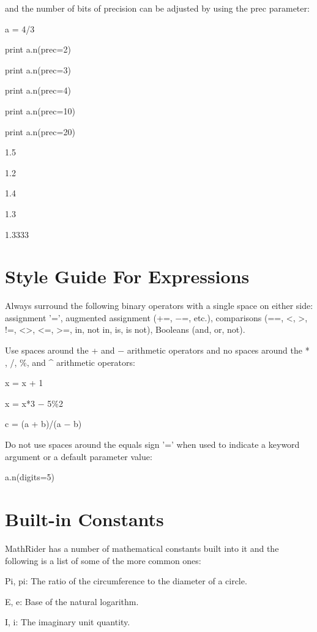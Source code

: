 \documentclass[12pt,oneside]{book}
\begin{document}
and the number of bits of precision can be adjusted by using the prec parameter:


a = 4/3

print a.n(prec=2)

print a.n(prec=3)

print a.n(prec=4)

print a.n(prec=10)

print a.n(prec=20)

{\textbar}

1.5

1.2

1.4

1.3

1.3333

\section[Style Guide For Expressions]{Style Guide For Expressions}

Always surround the following binary operators with a single space on either side: assignment '=', augmented assignment (+=, $-$=, etc.), comparisons (==, {\textless}, {\textgreater}, !=, {\textless}{\textgreater}, {\textless}=, {\textgreater}=, in, not in, is, is not), Booleans (and, or, not). 

Use spaces around the + and $-$ arithmetic operators and no spaces around the * , /, \%, and \^{} arithmetic operators:

x = x + 1

x = x*3 $-$ 5\%2

c = (a + b)/(a $-$ b)


Do not use spaces around the equals sign '=' when used to indicate a keyword argument or a default parameter value:

a.n(digits=5)

\section[Built{}-in Constants]{Built{}-in Constants}

MathRider has a number of mathematical constants built into it and the following is a list of some of the more common ones: 

Pi, pi: The ratio of the circumference to the diameter of a circle.


E, e: Base of the natural logarithm.


I, i: The imaginary unit quantity.

\ \ \ \ \ 
\end{document}
